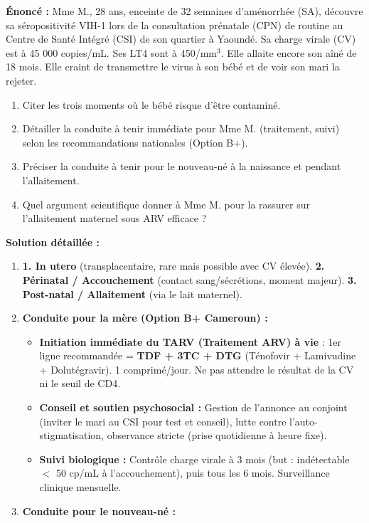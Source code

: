 \documentclass[11pt]{article}
\begin{document}
\begin{exoresolu}
\textbf{Énoncé :} Mme M., 28 ans, enceinte de 32 semaines d'aménorrhée (SA), découvre sa séropositivité VIH-1 lors de la consultation prénatale (CPN) de routine au Centre de Santé Intégré (CSI) de son quartier à Yaoundé. Sa charge virale (CV) est à 45 000 copies/mL. Ses LT4 sont à 450/mm$^3$. Elle allaite encore son aîné de 18 mois. Elle craint de transmettre le virus à son bébé et de voir son mari la rejeter.
\begin{enumerate}
    \item Citer les trois moments où le bébé risque d'être contaminé.
    \item Détailler la conduite à tenir immédiate pour Mme M. (traitement, suivi) selon les recommandations nationales (Option B+).
    \item Préciser la conduite à tenir pour le nouveau-né à la naissance et pendant l'allaitement.
    \item Quel argument scientifique donner à Mme M. pour la rassurer sur l'allaitement maternel sous ARV efficace ?
\end{enumerate}
\tcblower
\textbf{Solution détaillée :}
\begin{enumerate}
    \item \textbf{1. In utero} (transplacentaire, rare mais possible avec CV élevée). \textbf{2. Périnatal / Accouchement} (contact sang/sécrétions, moment majeur). \textbf{3. Post-natal / Allaitement} (via le lait maternel).
    \item \textbf{Conduite pour la mère (Option B+ Cameroun) :}
    \begin{itemize}
        \item \textbf{Initiation immédiate du TARV (Traitement ARV) à vie} : 1er ligne recommandée = \textbf{TDF + 3TC + DTG} (Ténofovir + Lamivudine + Dolutégravir). 1 comprimé/jour. Ne pas attendre le résultat de la CV ni le seuil de CD4.
        \item \textbf{Conseil et soutien psychosocial :} Gestion de l'annonce au conjoint (inviter le mari au CSI pour test et conseil), lutte contre l'auto-stigmatisation, observance stricte (prise quotidienne à heure fixe).
        \item \textbf{Suivi biologique :} Contrôle charge virale à 3 mois (but : indétectable $<$ 50 cp/mL à l'accouchement), puis tous les 6 mois. Surveillance clinique mensuelle.
    \end{itemize}
    \item \textbf{Conduite pour le nouveau-né :}

\end{enumerate}
\end{exoresolu}
\end{document}
